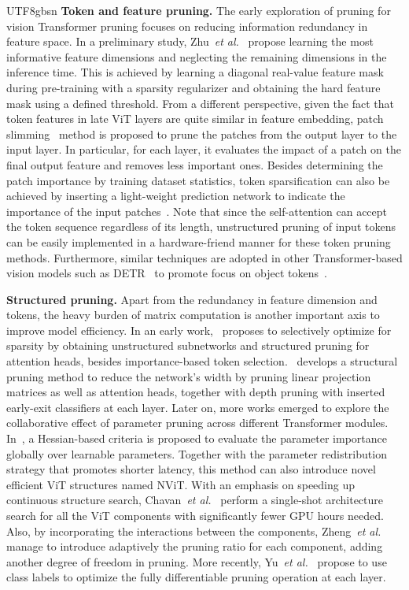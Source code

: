 \documentclass[10pt,journal,compsoc]{IEEEtran}
\newcommand{\etal}{\emph{et al.}}
\newcommand{\<}{\left\langle}
\renewcommand{\>}{\right\rangle}
\newcommand{\1}{\mathbbm{1}}
\begin{document}
\begin{CJK}{UTF8}{gbsn}
\textbf{Token and feature pruning.} The early exploration of pruning for vision Transformer pruning focuses on reducing information redundancy in feature space. In a preliminary study, Zhu~\etal~\cite{Zhu2021VisionTP} propose learning the most informative feature dimensions and neglecting the remaining dimensions in the inference time. This is achieved by learning a diagonal real-value feature mask during pre-training with a sparsity regularizer and obtaining the hard feature mask using a defined threshold. From a different perspective, given the fact that token features in late ViT layers are quite similar in feature embedding, patch slimming~\cite{Tang2021PatchSF} method is proposed to prune the patches from the output layer to the input layer. In particular, for each layer, it evaluates the impact of a patch on the final output feature and removes less important ones. Besides determining the patch importance by training dataset statistics, token sparsification can also be achieved by inserting a light-weight prediction network to indicate the importance of the input patches~\cite{Tang2021PatchSF,Rao2021DynamicViTEV,Wang2021NotAI,Liang2022NotAP,Chen2021ChasingSI}. Note that since the self-attention can accept the token sequence regardless of its length, unstructured pruning of input tokens can be easily implemented in a hardware-friend manner for these token pruning methods. Furthermore, similar techniques are adopted in other Transformer-based vision models such as DETR~\cite{Carion2020EndtoEndOD} to promote focus on object tokens~\cite{Roh2021SparseDE,Zheng2023LessIM}. 

\textbf{Structured pruning.} Apart from the redundancy in feature dimension and tokens, the heavy burden of matrix computation is another important axis to improve model efficiency. In an early work,~\cite{Chen2021ChasingSI} proposes to selectively optimize for sparsity by obtaining unstructured subnetworks and structured pruning for attention heads, besides importance-based token selection.~\cite{Yu2022WidthD} develops a structural pruning method to reduce the network's width by pruning linear projection matrices as well as attention heads, together with depth pruning with inserted early-exit classifiers at each layer. Later on, more works emerged to explore the collaborative effect of parameter pruning across different Transformer modules. In~\cite{Yang2021GlobalVT}, a Hessian-based criteria is proposed to evaluate the parameter importance globally over learnable parameters. Together with the parameter redistribution strategy that promotes shorter latency, this method can also introduce novel efficient ViT structures named NViT. With an emphasis on speeding up continuous structure search, Chavan~\etal~\cite{Chavan2022VisionTS} perform a single-shot architecture search for all the ViT components with significantly fewer GPU hours needed. Also, by incorporating the interactions between the components, Zheng~\etal~\cite{Zheng2022SAViTSV} manage to introduce adaptively the pruning ratio for each component, adding another degree of freedom in pruning. More recently, Yu~\etal~\cite{Yu2023XPrunerEP} propose to use class labels to optimize the fully differentiable pruning operation at each layer.


\end{CJK}
\end{document}
